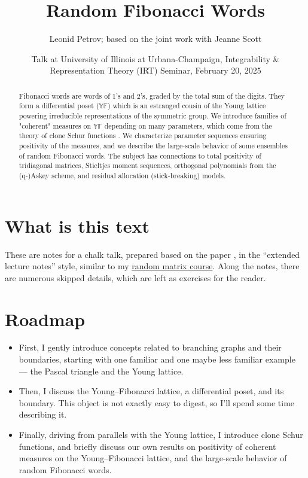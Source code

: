 \documentclass[letterpaper,11pt,oneside,reqno]{article}
\numberwithin{equation}{section}
\theoremstyle{definition}
\begin{document}
\title{Random Fibonacci Words}


\author{Leonid Petrov; based on the joint work with Jeanne Scott \cite{PetrovScott2024Fibonacci}}

\date{Talk at University of Illinois at Urbana-Champaign, Integrability \& Representation Theory (IRT) Seminar, February 20, 2025}


\maketitle

\begin{abstract}
	Fibonacci words are words of 1's and 2's, graded by the total sum of the digits. They form a differential poset ($\mathbb{YF}$) which is an estranged cousin of the Young lattice powering irreducible representations of the symmetric group. We introduce families of "coherent" measures on $\mathbb{YF}$ depending on many parameters, which come from the theory of clone Schur functions \cite{okada1994algebras}. We characterize parameter sequences ensuring positivity of the measures, and we describe the large-scale behavior of some ensembles of random Fibonacci words. The subject has connections to total positivity of tridiagonal matrices, Stieltjes moment sequences, orthogonal polynomials from the (q-)Askey scheme, and residual allocation (stick-breaking) models.
\end{abstract}

\section*{What is this text}

These are notes for a chalk talk, prepared based on the paper
\cite{PetrovScott2024Fibonacci}, in the ``extended lecture notes''
style, similar to my \href{https://lpetrov.cc/rmt25/}{random matrix course}.
Along the notes, there are numerous skipped details,
which are left as exercises for the reader.

\setcounter{tocdepth}{1}
\tableofcontents
\setcounter{tocdepth}{3}
\newpage
\section{Roadmap}
\begin{itemize}
\item First, I gently introduce concepts related to branching graphs and their boundaries,
starting with one familiar and one maybe less familiar example ---
the Pascal triangle and the Young lattice.

\item Then, I discuss the Young--Fibonacci lattice, a differential poset, and its boundary. This object
is not exactly easy to digest, so I'll spend some time describing it.

\item Finally, driving from parallels with the Young lattice, I introduce clone Schur functions,
and briefly discuss our own results on positivity of coherent measures on the Young--Fibonacci lattice,
and the large-scale behavior of random Fibonacci words.
\end{itemize}
\end{document}
